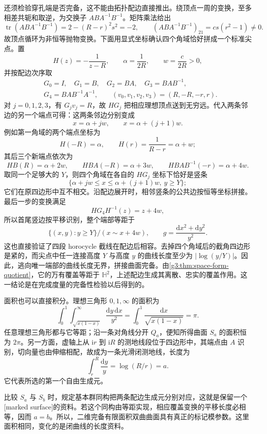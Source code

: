 \ProseParagraphBreak
还须检验穿孔端是否完备，这不能由拓扑配边直接推出。绕顶点一周的变换，至多相差共轭和取逆，为交换子 \(ABA^{-1}B^{-1}\)。矩阵乘法给出
\[
	\operatorname{tr}(ABA^{-1}B^{-1})
	=2-(R-r)^2s^2=-2,
	\qquad
	(ABA^{-1}B^{-1})_{21}=cs(r^2-1)\ne0.
\]
故顶点循环为非恒等抛物变换。下面用显式坐标确认四个角域恰好拼成一个标准尖点。置
\[
	H(z)=-\frac1{z-R},\qquad
	\alpha=\frac1{2R},\qquad w=\frac{c}{2R}>0,
\]
并按配边次序取
\[
	\begin{aligned}
		&G_0=I,\quad G_1=B,\quad G_2=BA,\quad G_3=BAB^{-1},\\
		&G_4=BAB^{-1}A^{-1},\qquad
		(v_0,v_1,v_2,v_3)=(R,-R,-r,r).
	\end{aligned}
\]
对 \(j=0,1,2,3\)，有 \(G_jv_j=R\)，故 \(HG_j\) 把相应理想顶点送到无穷远。代入两条邻边的另一个端点可得：这两条邻边分别变成
\[
	x=\alpha+jw,\qquad x=\alpha+(j+1)w.
\]
例如第一角域的两个端点坐标为
\[
	H(-R)=\alpha,\qquad H(r)=\frac1{R-r}=\alpha+w;
\]
其后三个新端点依次为
\[
	HB(R)=\alpha+2w,\qquad
	HBA(-R)=\alpha+3w,\qquad
	HBAB^{-1}(-r)=\alpha+4w.
\]
取同一个足够大的 \(Y\)，则四个角域在各自的 \(HG_j\) 坐标下恰好是竖条
\[
	\{\alpha+jw\le x\le\alpha+(j+1)w,\ y\ge Y\};
\]
它们在原四边形中互不相交。沿配边展开时，相邻竖条的公共边按恒等坐标拼接。最后一步的变换满足
\[
	HG_4H^{-1}(z)=z+4w,
\]
所以首尾竖边按平移识别，整个端部等距于
\[
	\{(x,y):y\ge Y\}/(x\sim x+4w),
	\qquad g=\frac{\mathrm dx^2+\mathrm dy^2}{y^2}.
\]
这也直接验证了四段 horocycle 截线在配边后相容。去掉四个角域后的截角四边形是紧的，而尖点中任一连接高度 \(Y\) 与高度 \(y\) 的曲线长度至少为 \(\lvert\log(y/Y)\rvert\)。因此，逃向唯一端部的曲线长度无界，拼接曲面完备。由\cref{g3:thm:space-form-quotient}，它的万有覆盖等距于 \(\mathbb H^2\)，上述配边生成其离散、忠实的覆盖作用。这一结论是在完成度量的完备性检验以后得到的。

\ProseParagraphBreak
面积也可以直接积分。理想三角形 \(0,1,\infty\) 的面积为
\[
	\int_0^1\int_{\sqrt{x(1-x)}}^\infty
	\frac{\mathrm dy\,\mathrm dx}{y^2}
	=\int_0^1\frac{\mathrm dx}{\sqrt{x(1-x)}}=\pi.
\]
任意理想三角形都与它等距；沿一条对角线分开 \(Q_a\)，便知所得曲面 \(S_a\) 的面积恒为 \(2\pi\)。另一方面，虚轴上从 \(\mathrm ir\) 到 \(\mathrm iR\) 的测地线段位于四边形中，其端点由 \(A\) 识别，切向量也由伸缩相配，故成为一条光滑闭测地线，长度为
\[
	\int_r^R\frac{\mathrm dy}{y}=\log(R/r)=a.
\]
它代表所选的第一个自由生成元。

\ProseParagraphBreak
比较 \(S_a\) 与 \(S_b\) 时，规定基本群同构把两条配边生成元分别对应，这就是保留一个[marked surface]的资料。若这个同构由等距实现，相应覆盖变换的平移长度必相等，因而 \(a=b\)。所以，二维完备有限面积双曲曲面具有真正的标记模参数。这里面积相同，变化的是闭曲线的长度资料。

